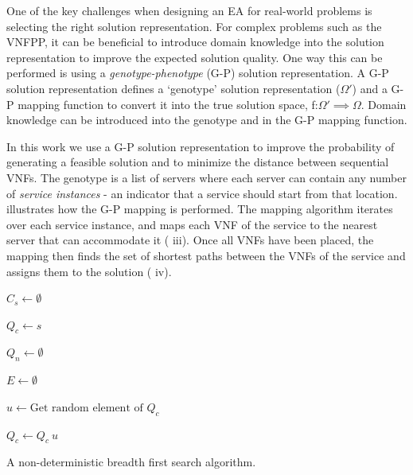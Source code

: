 
One of the key challenges when designing an EA for real-world problems is selecting the right solution representation. For complex problems such as the VNFPP, it can be beneficial to introduce domain knowledge into the solution representation to improve the expected solution quality. One way this can be performed is using a \textit{genotype-phenotype} (G-P) solution representation. A G-P solution representation defines a `genotype' solution representation ($\Omega'$) and a G-P mapping function to convert it into the true solution space, f:$\Omega' \implies \Omega$. Domain knowledge can be introduced into the genotype and in the G-P mapping function.

In this work we use a G-P solution representation to improve the probability of generating a feasible solution and to minimize the distance between sequential VNFs. The genotype is a list of servers where each server can contain any number of \textit{service instances} - an indicator that a service should start from that location.  illustrates how the G-P mapping is performed. The mapping algorithm iterates over each service instance, and maps each VNF of the service to the nearest server that can accommodate it ( iii). Once all VNFs have been placed, the mapping then finds the set of shortest paths between the VNFs of the service and assigns them to the solution ( iv).

\begin{algorithm}[t!]
	


    $C_s \gets \emptyset$
    
    $Q_c \gets {s}$ 

    $Q_n \gets \emptyset$ 

    $E \gets \emptyset$ 

     {
        $u \gets \text{Get random element of } Q_c$

        $Q_c \gets Q_c \ u$
        


    }

	\caption{A non-deterministic breadth first search algorithm.}
	\label{alg:nd_bfs}
\end{algorithm}

